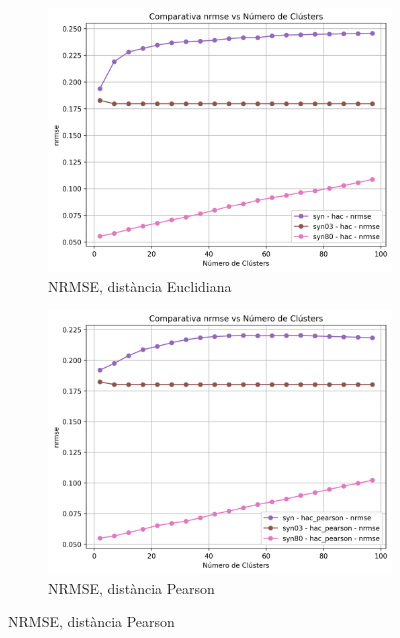 \documentclass[a4paper,12pt]{report}
\begin{document}
\begin{figure}[H]
    \vspace{1em}

    \begin{subfigure}[b]{0.49\textwidth}
        \includegraphics[width=\textwidth]{Figuras/nrmse-hac-sin.png}
        \caption{NRMSE, distància Euclidiana}
        \label{fig:hac-clustering-sin-results-c}
    \end{subfigure}
    \hfill
    \begin{subfigure}[b]{0.49\textwidth}
        \includegraphics[width=\textwidth]{Figuras/nrmse-hac_pearson-sin.png}
        \caption{NRMSE, distància Pearson}
        \label{fig:hac-clustering-sin-results-d}
    \end{subfigure}


\end{figure}
\end{document}
